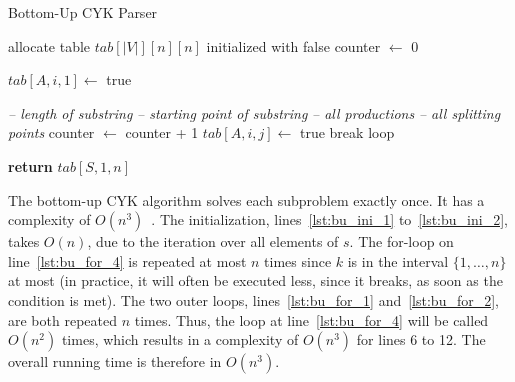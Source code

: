 \begin{algorithm}[H]
    \caption{Bottom-Up CYK Parser}
    \label{alg:bu}
    \begin{algorithmic}[1]
        \State allocate table $tab[|V|][n][n]$ initialized with false
        \State counter $\leftarrow$ 0 \label{lst:bu_ini_1}
    
                \State $tab[A,i,1] \leftarrow$ true
            \EndFor
        \EndFor \label{lst:bu_ini_2}

         \hspace*{2.75cm}\textit{-- length of substring} \label{lst:bu_for_1}
             \hspace*{1cm}\textit{-- starting point of substring} \label{lst:bu_for_2}
                 \hspace*{1cm}\textit{-- all productions} \label{lst:bu_for_3}
                     \hspace*{0.5cm}\textit{-- all splitting points} \label{lst:bu_for_4}
                        \State counter $\leftarrow$ counter + 1
                            \State $tab[A,i,j]\leftarrow$ true
                            \State break loop
                        \EndIf
                    \EndFor
                \EndFor
            \EndFor
        \EndFor

        \State \textbf{return} $tab[S,1,n]$
        \EndFunction
    \end{algorithmic}
\end{algorithm}

The bottom-up CYK algorithm solves each subproblem exactly once.
It has a complexity of $O(n^3)$~\cite{automata}.
The initialization, lines~\ref{lst:bu_ini_1} to~\ref{lst:bu_ini_2}, takes $O(n)$, due to the iteration over all elements of $s$.
The for-loop on line~\ref{lst:bu_for_4} is repeated at most $n$ times since $k$ is in the interval $\{1,\dots,n\}$ at most (in practice, it will often be executed less, since it breaks, as soon as the condition is met).
The two outer loops, lines~\ref{lst:bu_for_1} and~\ref{lst:bu_for_2}, are both repeated $n$ times.
Thus, the loop at line~\ref{lst:bu_for_4} will be called $O(n^2)$ times, which results in a complexity of $O(n^3)$ for lines 6 to 12.
The overall running time is therefore in $O(n^3)$.

